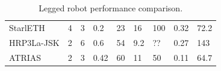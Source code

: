 \begin{table}[]
\begin{tabular}{lllllllll}
StarlETH       & 4                       & 3            & 0.2                         & 23                     & 16                           & 100                 & 0.32                         & 72.2                              \\
HRP3La-JSK     & 2                       & 6            & 0.6                         & 54                     & 9.2                          & ??                  & 0.27                         & 143                               \\
ATRIAS         & 2                       & 3            & 0.42                        & 60                     & 11                           & 50                  & 0.11                         & 64.7                             
\end{tabular}
\caption{Legged robot performance comparison.\cite{Kalouche2016}}
\label{tbl:Robot performance comparison}
\end{table}